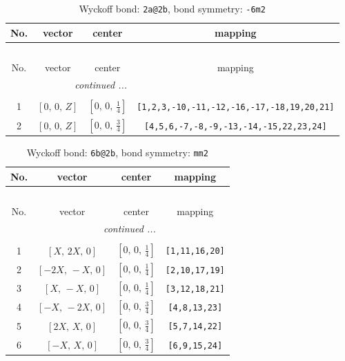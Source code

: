 \documentclass[fleqn,8pt]{jsarticle}
\begin{document}
\renewcommand{\arraystretch}{1.2}
\begin{longtable}{cccc}
\caption{Wyckoff bond: {\tt 2a@2b}, bond symmetry: {\tt -6m2}}
 \\
 \hline \hline
No. & vector & center & mapping \\ \hline \endfirsthead

\multicolumn{3}{l}{\tablename\ \thetable{}} \\
 \hline \hline
No. & vector & center & mapping \\ \hline \endhead

 \hline \hline
\multicolumn{3}{r}{\footnotesize\it continued ...} \\ \endfoot

 \hline \hline
\multicolumn{3}{r}{} \\ \endlastfoot

1 & $\left[ 0,\, 0,\, Z \right]$ & $\left[ 0,\, 0,\, \frac{1}{4} \right]$ & {\tt [1,2,3,-10,-11,-12,-16,-17,-18,19,20,21]} \\ \hline
2 & $\left[ 0,\, 0,\, Z \right]$ & $\left[ 0,\, 0,\, \frac{3}{4} \right]$ & {\tt [4,5,6,-7,-8,-9,-13,-14,-15,22,23,24]} \\
\end{longtable}
\renewcommand{\arraystretch}{1.2}
\begin{longtable}{cccc}
\caption{Wyckoff bond: {\tt 6b@2b}, bond symmetry: {\tt mm2}}
 \\
 \hline \hline
No. & vector & center & mapping \\ \hline \endfirsthead

\multicolumn{3}{l}{\tablename\ \thetable{}} \\
 \hline \hline
No. & vector & center & mapping \\ \hline \endhead

 \hline \hline
\multicolumn{3}{r}{\footnotesize\it continued ...} \\ \endfoot

 \hline \hline
\multicolumn{3}{r}{} \\ \endlastfoot

1 & $\left[ X,\, 2 X,\, 0 \right]$ & $\left[ 0,\, 0,\, \frac{1}{4} \right]$ & {\tt [1,11,16,20]} \\ \hline
2 & $\left[ - 2 X,\, - X,\, 0 \right]$ & $\left[ 0,\, 0,\, \frac{1}{4} \right]$ & {\tt [2,10,17,19]} \\ \hline
3 & $\left[ X,\, - X,\, 0 \right]$ & $\left[ 0,\, 0,\, \frac{1}{4} \right]$ & {\tt [3,12,18,21]} \\ \hline
4 & $\left[ - X,\, - 2 X,\, 0 \right]$ & $\left[ 0,\, 0,\, \frac{3}{4} \right]$ & {\tt [4,8,13,23]} \\ \hline
5 & $\left[ 2 X,\, X,\, 0 \right]$ & $\left[ 0,\, 0,\, \frac{3}{4} \right]$ & {\tt [5,7,14,22]} \\ \hline
6 & $\left[ - X,\, X,\, 0 \right]$ & $\left[ 0,\, 0,\, \frac{3}{4} \right]$ & {\tt [6,9,15,24]} \\
\end{longtable}
\end{document}
